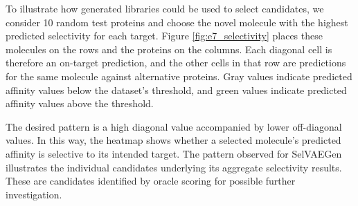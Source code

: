 \documentclass[a4paper,12pt]{article}
\begin{document}
To illustrate how generated libraries could be used to select candidates, we consider 10 random test proteins and choose the novel molecule with the highest predicted selectivity for each target. Figure \ref{fig:e7_selectivity} places these molecules on the rows and the proteins on the columns. Each diagonal cell is therefore an on-target prediction, and the other cells in that row are predictions for the same molecule against alternative proteins. Gray values indicate predicted affinity values below the dataset's threshold, and green values indicate predicted affinity values above the threshold.

The desired pattern is a high diagonal value accompanied by lower off-diagonal values. In this way, the heatmap shows whether a selected molecule's predicted affinity is selective to its intended target. The pattern observed for SelVAEGen illustrates the individual candidates underlying its aggregate selectivity results. These are candidates identified by oracle scoring for possible further investigation.
\end{document}
